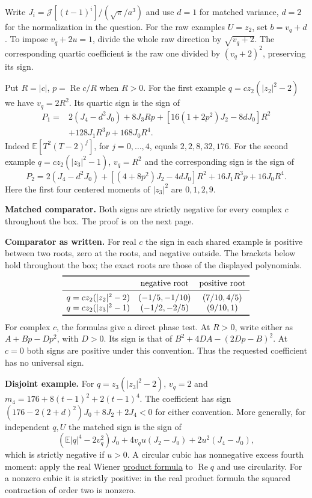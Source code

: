 \documentclass[11pt]{article}
\newcommand{\E}{\mathbb E}\newcommand{\C}{\mathbb C}\newcommand{\R}{\mathbb R}
\newcommand{\J}{\mathcal J}\newcommand{\ind}{\mathbf 1}
\newcommand{\head}[1]{\par\smallskip{\large\bfseries\color{ink}#1}\par\smallskip}
\begin{document}
\newpage
\head{Quartic signs for the three examples}
Write \(J_i=\J[(t-1)^i]/(\sqrt\pi/a^3)\) and use \(d=1\) for matched variance,
\(d=2\) for the normalization in the question. For the raw examples \(U=z_2\),
set \(b=v_q+d\). To impose \(v_q+2u=1\), divide the whole raw direction by
\(\sqrt{v_q+2}\). The corresponding quartic coefficient is the raw one divided by
\((v_q+2)^2\), preserving its sign.

Put \(R=|c|\), \(p=\operatorname{Re}c/R\) when \(R>0\). For the first example
\(q=cz_2(|z_2|^2-2)\) we have \(v_q=2R^2\). Its quartic sign is the sign of
\[
 \begin{aligned}
 P_1={}&2(J_4-d^2J_0)+8J_3Rp
  +[16(1+2p^2)J_2-8dJ_0]R^2\\
 &+128J_1R^3p+168J_0R^4 .
 \end{aligned}
\]
Indeed \(\E[T^2(T-2)^j]\), for \(j=0,\ldots,4\), equals \(2,2,8,32,176\).
For the second example \(q=cz_2(|z_3|^2-1)\), \(v_q=R^2\) and the corresponding
sign is the sign of
\[
 P_2=2(J_4-d^2J_0)+[(4+8p^2)J_2-4dJ_0]R^2
          +16J_1R^3p+16J_0R^4 .
\]
Here the first four centered moments of \(|z_3|^2\) are \(0,1,2,9\).

\textbf{Matched comparator.} Both signs are strictly negative for every complex
\(c\) throughout the box. The proof is on the next page.

\textbf{Comparator as written.} For real \(c\) the sign in each shared example is
positive between two roots, zero at the roots, and negative outside. The brackets
below hold throughout the box; the exact roots are those of the displayed polynomials.
\[
 \begin{array}{lcc}
 \toprule & \text{negative root} & \text{positive root}\\ \midrule
 q=cz_2(|z_2|^2-2)&(-1/5,-1/10)&(7/10,4/5)\\
 q=cz_2(|z_3|^2-1)&(-1/2,-2/5)&(9/10,1)\\ \bottomrule
 \end{array}
\]
For complex \(c\), the formulas give a direct phase test. At \(R>0\), write either
as \(A+Bp-Dp^2\), with \(D>0\). Its sign is that of
\(B^2+4DA-(2Dp-B)^2\). At \(c=0\) both signs are positive under this convention.
Thus the requested coefficient has no universal sign.

\textbf{Disjoint example.} For \(q=z_3(|z_3|^2-2)\), \(v_q=2\) and
\(m_4=176+8(t-1)^2+2(t-1)^4\). The coefficient has sign
\((176-2(2+d)^2)J_0+8J_2+2J_4<0\) for either convention.
More generally, for independent \(q,U\) the matched sign is the sign of
\[
 (\E|q|^4-2v_q^2)J_0+4v_qu(J_2-J_0)+2u^2(J_4-J_0),
\]
which is strictly negative if \(u>0\). A circular cubic has nonnegative excess
fourth moment: apply the real Wiener
\href{https://publications.uni.lu/bitstream/10993/13581/1/NouPecRei_AOP.pdf}{product formula}
to \(\operatorname{Re}q\)
and use circularity. For a nonzero cubic it is strictly positive: in the real
product formula the squared contraction of order two is nonzero.
\end{document}
